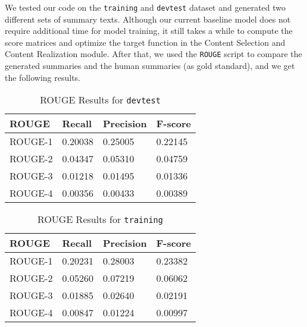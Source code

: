 \documentclass[11pt]{article}
\begin{document}
We tested our code on the \texttt{training} and \texttt{devtest} dataset and generated two different sets of summary texts. Although our current baseline model does not require additional time for model training, it still takes a while to compute the score matrices and optimize the target function in the Content Selection and Content Realization module. After that, we used the \texttt{ROUGE} script to compare the generated summaries and the human summaries (as gold standard), and we get the following results.
\begin{table}[h!]
\centering
\caption{ROUGE Results for \texttt{devtest}}
\begin{tabular}{|l|l|l|l|}
\hline
ROUGE   & Recall  & Precision & F-score \\ \hline
ROUGE-1 & 0.20038 & 0.25005   & 0.22145 \\ \hline
ROUGE-2 & 0.04347 & 0.05310   & 0.04759 \\ \hline
ROUGE-3 & 0.01218 & 0.01495   & 0.01336 \\ \hline
ROUGE-4 & 0.00356 & 0.00433   & 0.00389 \\ \hline
\end{tabular}
\end{table}
\begin{table}[h!]
\centering
\caption{ROUGE Results for \texttt{training}}
\begin{tabular}{|l|l|l|l|}
\hline
ROUGE   & Recall  & Precision & F-score \\ \hline
ROUGE-1 & 0.20231 & 0.28003   & 0.23382 \\ \hline
ROUGE-2 & 0.05260 & 0.07219   & 0.06062 \\ \hline
ROUGE-3 & 0.01885 & 0.02640   & 0.02191 \\ \hline
ROUGE-4 & 0.00847 & 0.01224   & 0.00997 \\ \hline
\end{tabular}
\end{table}
\end{document}
